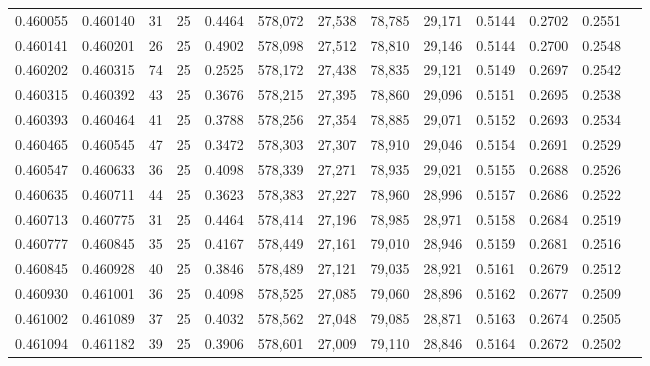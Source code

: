 \begin{tabular}{rrrrrrrrrrrrr}
0.460055 & 0.460140 &    31 &  25 &                                     0.4464 & 578,072 &  27,538 &  78,785 &  29,171 & 0.5144 & 0.2702 & 0.2551 \\
0.460141 & 0.460201 &    26 &  25 &                                     0.4902 & 578,098 &  27,512 &  78,810 &  29,146 & 0.5144 & 0.2700 & 0.2548 \\
0.460202 & 0.460315 &    74 &  25 &                                     0.2525 & 578,172 &  27,438 &  78,835 &  29,121 & 0.5149 & 0.2697 & 0.2542 \\
0.460315 & 0.460392 &    43 &  25 &                                     0.3676 & 578,215 &  27,395 &  78,860 &  29,096 & 0.5151 & 0.2695 & 0.2538 \\
0.460393 & 0.460464 &    41 &  25 &                                     0.3788 & 578,256 &  27,354 &  78,885 &  29,071 & 0.5152 & 0.2693 & 0.2534 \\
0.460465 & 0.460545 &    47 &  25 &                                     0.3472 & 578,303 &  27,307 &  78,910 &  29,046 & 0.5154 & 0.2691 & 0.2529 \\
0.460547 & 0.460633 &    36 &  25 &                                     0.4098 & 578,339 &  27,271 &  78,935 &  29,021 & 0.5155 & 0.2688 & 0.2526 \\
0.460635 & 0.460711 &    44 &  25 &                                     0.3623 & 578,383 &  27,227 &  78,960 &  28,996 & 0.5157 & 0.2686 & 0.2522 \\
0.460713 & 0.460775 &    31 &  25 &                                     0.4464 & 578,414 &  27,196 &  78,985 &  28,971 & 0.5158 & 0.2684 & 0.2519 \\
0.460777 & 0.460845 &    35 &  25 &                                     0.4167 & 578,449 &  27,161 &  79,010 &  28,946 & 0.5159 & 0.2681 & 0.2516 \\
0.460845 & 0.460928 &    40 &  25 &                                     0.3846 & 578,489 &  27,121 &  79,035 &  28,921 & 0.5161 & 0.2679 & 0.2512 \\
0.460930 & 0.461001 &    36 &  25 &                                     0.4098 & 578,525 &  27,085 &  79,060 &  28,896 & 0.5162 & 0.2677 & 0.2509 \\
0.461002 & 0.461089 &    37 &  25 &                                     0.4032 & 578,562 &  27,048 &  79,085 &  28,871 & 0.5163 & 0.2674 & 0.2505 \\
0.461094 & 0.461182 &    39 &  25 &                                     0.3906 & 578,601 &  27,009 &  79,110 &  28,846 & 0.5164 & 0.2672 & 0.2502 \\

\end{tabular}
